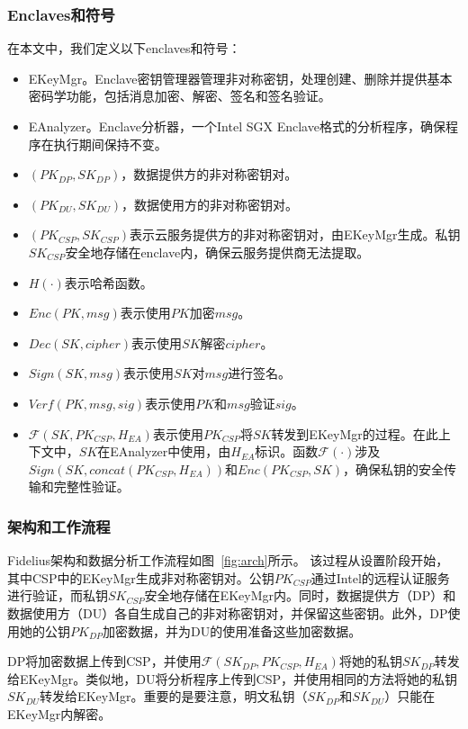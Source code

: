 \subsubsection{Enclaves和符号}
在本文中，我们定义以下enclaves和符号：
\begin{itemize}
    \item EKeyMgr。Enclave密钥管理器管理非对称密钥，处理创建、删除并提供基本密码学功能，包括消息加密、解密、签名和签名验证。
    \item EAnalyzer。Enclave分析器，一个Intel SGX Enclave格式的分析程序，确保程序在执行期间保持不变。
    \item $(PK_{DP},SK_{DP})$，数据提供方的非对称密钥对。
    \item $(PK_{DU},SK_{DU})$，数据使用方的非对称密钥对。
    \item $(PK_{CSP}, SK_{CSP})$表示云服务提供方的非对称密钥对，由EKeyMgr生成。私钥$SK_{CSP}$安全地存储在enclave内，确保云服务提供商无法提取。
    \item $H(\cdot)$表示哈希函数。
    \item $Enc(PK, msg)$表示使用$PK$加密$msg$。
    \item $Dec(SK, cipher)$表示使用$SK$解密$cipher$。
    \item $Sign(SK, msg)$表示使用$SK$对$msg$进行签名。
    \item $Verf(PK, msg, sig)$表示使用$PK$和$msg$验证$sig$。
    \item $\mathcal{F}(SK, PK_{CSP}, H_{EA})$表示使用$PK_{CSP}$将$SK$转发到EKeyMgr的过程。在此上下文中，$SK$在EAnalyzer中使用，由$H_{EA}$标识。函数$\mathcal{F}(\cdot)$涉及$Sign(SK, concat(PK_{CSP}, H_{EA}))$和$Enc(PK_{CSP}, SK)$，确保私钥的安全传输和完整性验证。
\end{itemize}

\subsubsection{架构和工作流程}

Fidelius架构和数据分析工作流程如图~\ref{fig:arch}所示。
该过程从设置阶段开始，其中CSP中的EKeyMgr生成非对称密钥对。公钥$PK_{CSP}$通过Intel的远程认证服务进行验证，而私钥$SK_{CSP}$安全地存储在EKeyMgr内。同时，数据提供方（DP）和数据使用方（DU）各自生成自己的非对称密钥对，并保留这些密钥。此外，DP使用她的公钥$PK_{DP}$加密数据，并为DU的使用准备这些加密数据。

DP将加密数据上传到CSP，并使用$\mathcal{F}(SK_{DP}, PK_{CSP}, H_{EA})$将她的私钥$SK_{DP}$转发给EKeyMgr。类似地，DU将分析程序上传到CSP，并使用相同的方法将她的私钥$SK_{DU}$转发给EKeyMgr。重要的是要注意，明文私钥（$SK_{DP}$和$SK_{DU}$）只能在EKeyMgr内解密。


